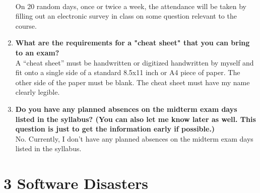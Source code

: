 \documentclass[10pt]{article}
\begin{document}
\begin{enumerate}
            \\On 20 random days, once or twice a week, the attendance will be taken by filling out an electronic survey in class on some question relevant to the course.
      \item \textbf{What are the requirements for a "cheat sheet" that you can bring to an exam?}
            \\A “cheat sheet” must be handwritten or digitized handwritten by myself and fit onto a single side of a standard 8.5x11 inch or A4 piece of paper. The other side of the paper must be blank. The cheat sheet must have my name clearly legible.
      \item \textbf{Do you have any planned absences on the midterm exam days listed in the syllabus? (You can also let me know later as well. This question is just to get the information early if possible.)}
            \\ No. Currently, I don't have any planned absences on the midterm exam days listed in the syllabus.
\end{enumerate}

\section*{3 \quad Software Disasters}
\end{document}
